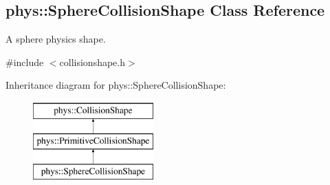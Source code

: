 \hypertarget{classphys_1_1SphereCollisionShape}{
\subsection{phys::SphereCollisionShape Class Reference}
\label{classphys_1_1SphereCollisionShape}
}


A sphere physics shape.  




{\ttfamily \#include $<$collisionshape.h$>$}

Inheritance diagram for phys::SphereCollisionShape:\begin{figure}[H]
\begin{center}
\leavevmode
\includegraphics[height=3.000000cm]{classphys_1_1SphereCollisionShape}
\end{center}
\end{figure}
